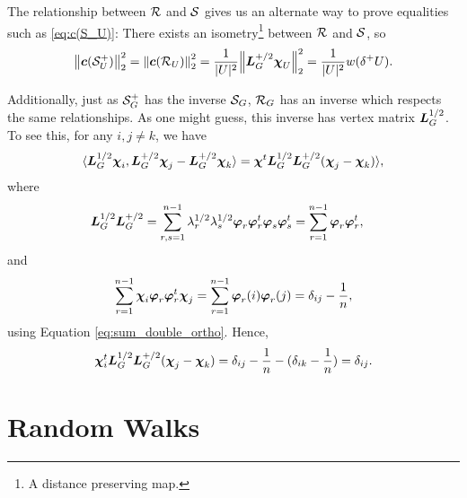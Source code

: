 The relationship between $\mathcal{R}$ and $\mathcal{S}$ gives us an alternate way to prove equalities such as \eqref{eq:c(S_U)}: There exists an isometry\footnote{A distance preserving map.} between $\mathcal{R}$ and $\mathcal{S}$, so 
\begin{equation*}
\norm{\vb*{c}(\mathcal{S}^+_U)}_2^2 = \norm{\vb*{c}(\mathcal{R}_U)}_2^2 = \frac{1}{|U|^2} \norm{\vb*{L}_G^{+/2}\boldsymbol{\chi}_U}_2^2 = \frac{1}{|U|^2}w(\delta^+ U).
\end{equation*}


Additionally, just as $\mathcal{S}_G^+$  has  the inverse $\mathcal{S}_G$, $\mathcal{R}_G$  has an inverse which respects the same  relationships. As one might guess, this inverse has vertex matrix $\vb*{L}_G^{1/2}$. To see this, for any $i,j\neq k$,  we have 
\begin{equation*}
\langle \vb*{L}_G^{1/2}\boldsymbol{\chi}_i,\vb*{L}_G^{+/2}\boldsymbol{\chi}_j-\vb*{L}_G^{+/2}\boldsymbol{\chi}_k\rangle = \boldsymbol{\chi}^t \vb*{L}_G^{1/2}\vb*{L}_G^{+/2}(\boldsymbol{\chi}_j-\boldsymbol{\chi}_k)\rangle,
\end{equation*}
where 
\begin{align*}
\vb*{L}_G^{1/2}\vb*{L}_G^{+/2} &= \sum_{r,s=1}^{n-1}\lambda_r^{1/2}\lambda_s^{1/2}\vb*{\varphi}_r\vb*{\varphi}_r^t\vb*{\varphi}_s\vb*{\varphi}_s^t = \sum_{r=1}^{n-1} \vb*{\varphi}_r\vb*{\varphi}_r^t,
\end{align*}
and 
\begin{align*}
\sum_{r=1}^{n-1}\boldsymbol{\chi}_i \vb*{\varphi}_r\vb*{\varphi}_r^t\boldsymbol{\chi}_j = \sum_{r=1}^{n-1}\vb*{\varphi}_r(i)\vb*{\varphi}_r(j) = \delta_{ij} - \frac{1}{n},
\end{align*}
using Equation \eqref{eq:sum_double_ortho}. Hence, 
\begin{align*}
\boldsymbol{\chi}_i^t \vb*{L}_G^{1/2}\vb*{L}_G^{+/2}(\boldsymbol{\chi}_j-\boldsymbol{\chi}_k) = \delta_{ij} - \frac{1}{n} - (\delta_{ik}-\frac{1}{n}) = \delta_{ij}.
\end{align*}




\section{Random Walks}
